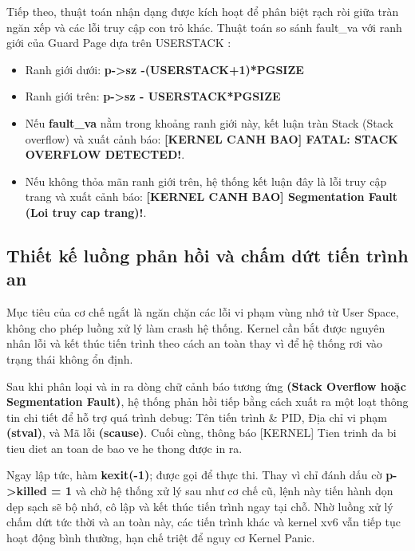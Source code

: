 Tiếp theo, thuật toán nhận dạng được kích hoạt để phân biệt rạch ròi giữa tràn ngăn xếp và các lỗi truy cập con trỏ khác. Thuật toán so sánh fault\_va  với ranh giới của Guard Page dựa trên USERSTACK :
\begin{itemize}
    \item Ranh giới dưới: \textbf{p->sz -(USERSTACK+1)*PGSIZE} 
    \item Ranh giới trên: \textbf{p->sz - USERSTACK*PGSIZE}
    \item  Nếu \textbf{fault\_va} nằm trong khoảng ranh giới này, kết luận tràn Stack (Stack overflow) và xuất cảnh báo: \textbf{[KERNEL CANH BAO] FATAL: STACK OVERFLOW DETECTED!}.
    \item Nếu không thỏa mãn ranh giới trên, hệ thống kết luận đây là lỗi truy cập trang và xuất cảnh báo: \textbf{[KERNEL CANH BAO] Segmentation Fault (Loi truy cap trang)!}.
\end{itemize}
\subsection{Thiết kế luồng phản hồi và chấm dứt tiến trình an  }
Mục tiêu của cơ chế ngắt là ngăn chặn các lỗi vi phạm vùng nhớ từ User Space, không cho phép luồng xử lý làm crash hệ thống. Kernel cần bắt được nguyên nhân lỗi và kết thúc tiến trình theo cách an toàn thay vì để hệ thống rơi vào trạng thái không ổn định.

Sau khi phân loại và in ra dòng chữ cảnh báo tương ứng \textbf{(Stack Overflow hoặc Segmentation Fault)}, hệ thống phản hồi tiếp bằng cách xuất ra một loạt thông tin chi tiết để hỗ trợ quá trình debug: Tên tiến trình \& PID, Địa chỉ vi phạm \textbf{(stval)}, và Mã lỗi \textbf{(scause)}. Cuối cùng, thông báo [KERNEL] Tien trinh da bi tieu diet an toan de bao ve he thong được in ra.


Ngay lập tức, hàm \textbf{kexit(-1)}; được gọi để thực thi. Thay vì chỉ đánh dấu cờ \textbf{p->killed = 1} và chờ hệ thống xử lý sau như cơ chế cũ, lệnh này tiến hành dọn dẹp sạch sẽ bộ nhớ, cô lập và kết thúc tiến trình ngay tại chỗ. Nhờ luồng xử lý chấm dứt tức thời và an toàn này, các tiến trình khác và kernel xv6 vẫn tiếp tục hoạt động bình thường, hạn chế triệt để nguy cơ Kernel Panic.

